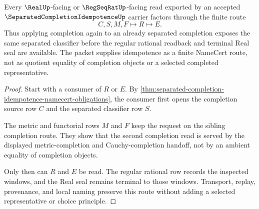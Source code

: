 \begin{theorem}
\label{thm:separated-completion-idempotence-real-regseqrat-route}
Every $\RealUp$-facing or $\RegSeqRatUp$-facing read exported by an accepted $\SeparatedCompletionIdempotenceUp$ carrier factors through the finite route
$$
C,S,M,F \longmapsto R \longmapsto E .
$$
Thus applying completion again to an already separated completion exposes the same separated classifier before the regular rational readback and terminal Real seal are available. The packet supplies idempotence as a finite NameCert route, not as quotient equality of completion objects or a selected completed representative.
\end{theorem}
\begin{proof}
Start with a consumer of $R$ or $E$. By \autoref{thm:separated-completion-idempotence-namecert-obligations}, the consumer first opens the completion source row $C$ and the separated classifier row $S$.

The metric and functorial rows $M$ and $F$ keep the request on the sibling completion route. They show that the second completion read is served by the displayed metric-completion and Cauchy-completion handoff, not by an ambient equality of completion objects.

Only then can $R$ and $E$ be read. The regular rational row records the inspected windows, and the Real seal remains terminal to those windows. Transport, replay, provenance, and local naming preserve this route without adding a selected representative or choice principle.
\end{proof}




